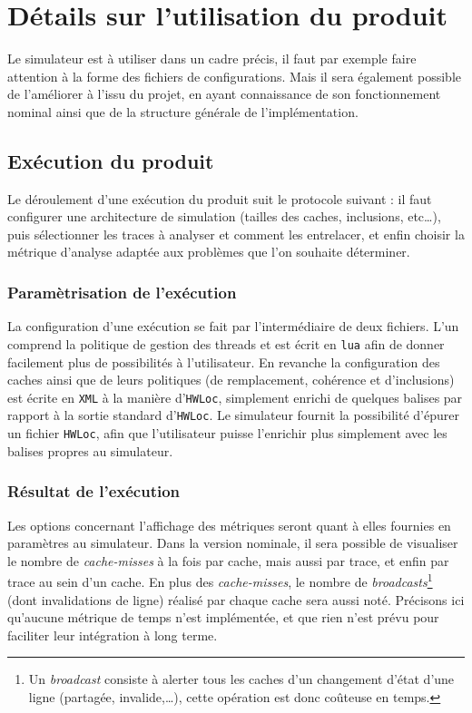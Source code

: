 \section{Détails sur l'utilisation du produit}

Le simulateur est à utiliser dans un cadre précis, il faut par exemple faire attention à la forme des fichiers de configurations. Mais il sera également possible de l'améliorer à l'issu du projet, en ayant connaissance de son fonctionnement nominal ainsi que de la structure générale de l'implémentation.

\subsection{Exécution du produit}

Le déroulement d'une exécution du produit suit le protocole suivant : il faut configurer une architecture de simulation (tailles des caches, inclusions, etc\ldots), puis sélectionner les traces à analyser et comment les entrelacer, et enfin choisir la métrique d'analyse adaptée aux problèmes que l'on souhaite déterminer.

\subsubsection{Paramètrisation de l'exécution}

La configuration d'une exécution se fait par l'intermédiaire de deux fichiers. L'un comprend la politique de gestion des threads et est écrit en \texttt{lua} afin de donner facilement plus de possibilités à l'utilisateur. En revanche la configuration des caches ainsi que de leurs politiques (de remplacement, cohérence et d'inclusions) est écrite en \texttt{XML} à la manière d'\texttt{HWLoc}, simplement enrichi de quelques balises par rapport à la sortie standard d'\texttt{HWLoc}. Le simulateur fournit la possibilité d'épurer un fichier \texttt{HWLoc}, afin que l'utilisateur puisse l'enrichir plus simplement avec les balises propres au simulateur.

\subsubsection{Résultat de l'exécution}
\label{métriques}

Les options concernant l'affichage des métriques seront quant à elles fournies en paramètres au simulateur. Dans la version nominale, il sera possible de visualiser le nombre de \emph{cache-misses} à la fois par cache, mais aussi par trace, et enfin par trace au sein d'un cache. En plus des \emph{cache-misses}, le nombre de \emph{broadcasts}\footnote{Un \emph{broadcast} consiste à alerter tous les caches d'un changement d'état d'une ligne (partagée, invalide,\ldots), cette opération est donc coûteuse en temps.} (dont invalidations de ligne) réalisé par chaque cache sera aussi noté. Précisons ici qu'aucune métrique de temps n'est implémentée, et que rien n'est prévu pour faciliter leur intégration à long terme.

